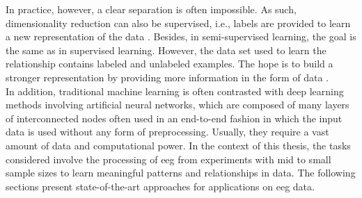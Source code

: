\noindent In practice, however, a clear separation is often impossible. As such, dimensionality reduction can also be supervised, i.e., labels are provided to learn a new representation of the data \cite{Mcinnes2018}. Besides, in semi-supervised learning, the goal is the same as in supervised learning. However, the data set used to learn the relationship contains labeled and unlabeled examples. The hope is to build a stronger representation by providing more information in the form of data \cite{Burkov2019}. \\
In addition, traditional machine learning is often contrasted with deep learning methods involving artificial neural networks, which are composed of many layers of interconnected nodes often used in an end-to-end fashion in which the input data is used without any form of preprocessing. Usually, they require a vast amount of data and computational power. In the context of this thesis, the tasks considered involve the processing of \gls{eeg} from experiments with mid to small sample sizes to learn meaningful patterns and relationships in data. The following sections present state-of-the-art approaches for applications on \gls{eeg} data.

